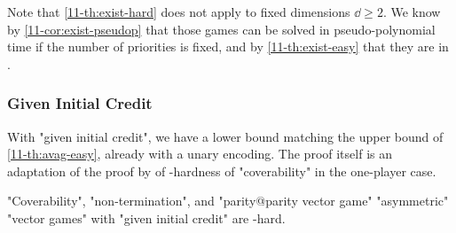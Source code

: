 Note that \cref{11-th:exist-hard} does not apply to fixed dimensions
$\dd\geq 2$.  We know by \cref{11-cor:exist-pseudop} that those games can
be solved in pseudo-polynomial time if the number of priorities is
fixed, and by \cref{11-th:exist-easy} that they are in \coNP.

\subsubsection{Given Initial Credit}
With "given initial credit", we have a lower bound matching the
\kEXP[2] upper bound of \cref{11-th:avag-easy}, already with a unary
encoding.  The proof itself is an adaptation of the proof by
 of \EXPSPACE-hardness of "coverability" in
the one-player case.

\begin{theorem}
\label{11-th:avag-hard}
  "Coverability", "non-termination", and "parity@parity vector game"
  "asymmetric" "vector games" with "given initial credit" are
  \kEXP[2]-hard.
\end{theorem}
